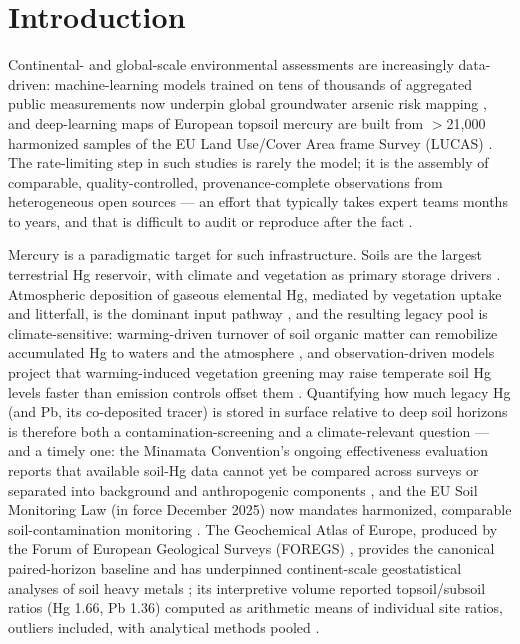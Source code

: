 \documentclass[11pt]{article}
\begin{document}
\section{Introduction}

Continental- and global-scale environmental assessments are increasingly
data-driven: machine-learning models trained on tens of thousands of
aggregated public measurements now underpin global groundwater arsenic risk
mapping \cite{podgorski2020}, and deep-learning maps of European topsoil
mercury are built from $>$21{,}000 harmonized samples of the EU Land
Use/Cover Area frame Survey (LUCAS) \cite{ballabio2021}. The rate-limiting step in such studies is rarely the
model; it is the assembly of comparable, quality-controlled, provenance-complete
observations from heterogeneous open sources --- an effort that typically takes
expert teams months to years, and that is difficult to audit or reproduce after
the fact \cite{reimann2005}.

Mercury is a paradigmatic target for such infrastructure. Soils are the
largest terrestrial Hg reservoir, with climate and vegetation as primary
storage drivers \cite{wang2019}. Atmospheric deposition of gaseous elemental
Hg, mediated by vegetation uptake and litterfall, is the dominant input
pathway \cite{obrist2017,jiskra2018}, and the resulting legacy pool is
climate-sensitive: warming-driven turnover of soil organic matter can
remobilize accumulated Hg to waters and the atmosphere
\cite{obrist2017,schuster2018,schaefer2020}, and observation-driven models
project that warming-induced vegetation greening may raise temperate soil Hg
levels faster than emission controls offset them \cite{liu2024}. Quantifying
how much legacy Hg (and Pb, its co-deposited tracer) is stored in surface
relative to deep soil horizons is therefore both a contamination-screening
and a climate-relevant question --- and a timely one: the Minamata
Convention's ongoing effectiveness evaluation reports that available soil-Hg
data cannot yet be compared across surveys or separated into background and
anthropogenic components \cite{unep2025}, and the EU Soil Monitoring Law (in
force December 2025) now mandates harmonized, comparable soil-contamination
monitoring \cite{eusml2025}. The Geochemical Atlas of Europe, produced by
the Forum of European Geological Surveys (FOREGS) \cite{salminen2005},
provides the canonical paired-horizon baseline and has underpinned
continent-scale geostatistical analyses of soil heavy metals
\cite{lado2008}; its interpretive volume reported
topsoil/subsoil ratios (Hg 1.66, Pb 1.36) computed as arithmetic means of
individual site ratios, outliers included, with analytical methods pooled
\cite{devos2006}.
\end{document}
